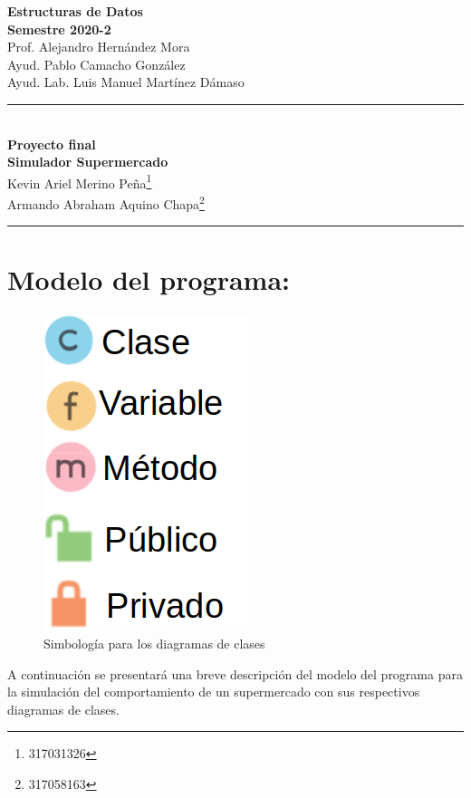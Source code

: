\documentclass[letterpaper,11pt]{article}
\begin{document}
\begin{center}
\vspace{-114pt}
\textbf{\large Estructuras de Datos}\\
\textbf{ Semestre 2020-2}\\
Prof. Alejandro Hernández Mora\\
Ayud. Pablo Camacho González  \\ 
Ayud. Lab. Luis Manuel Martínez Dámaso   \\
\rule{17cm}{0.3mm}\\
\textbf{Proyecto final}\\
\huge\textbf{Simulador Supermercado}\\[0.1cm]
\normalsize Kevin Ariel Merino Peña\footnote{317031326}\\
Armando Abraham Aquino Chapa\footnote{317058163}\\
\rule{17cm}{0.3mm}
\end{center}
\section*{Modelo del programa:}
\begin{figure}[htb]
	\centering
	\includegraphics[scale=.24]{Simbologia.png}
	\caption{ Simbología para los diagramas de clases}
\end{figure}
A continuación se presentará una breve descripción del modelo del programa para la simulación del comportamiento de un supermercado con sus respectivos diagramas de clases.\\
\end{document}
